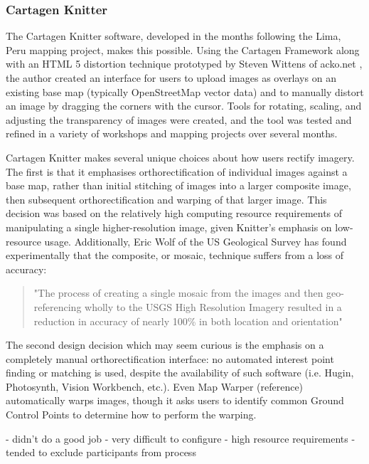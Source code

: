 \documentclass[11pt]{report}
\begin{document}
\subsubsection{Cartagen Knitter}

The Cartagen Knitter software, developed in the months following the Lima, Peru mapping project, makes this possible. Using the Cartagen Framework along with an HTML 5 distortion technique prototyped by Steven Wittens of acko.net \cite{wittens2008projective}, the author created an interface for users to upload images as overlays on an existing base map (typically OpenStreetMap vector data) and to manually distort an image by dragging the corners with the cursor. Tools for rotating, scaling, and adjusting the transparency of images were created, and the tool was tested and refined in a variety of workshops and mapping projects over several months. 

Cartagen Knitter makes several unique choices about how users rectify imagery. The first is that it emphasises orthorectification of individual images against a base map, rather than initial stitching of images into a larger composite image, then subsequent orthorectification and warping of that larger image. This decision was based on the relatively high computing resource requirements of manipulating a single higher-resolution image, given Knitter's emphasis on low-resource usage. Additionally, Eric Wolf of the US Geological Survey has found experimentally that the composite, or mosaic, technique suffers from a loss of accuracy: 

\begin{quote}
"The process of creating a single mosaic from the images and then geo-referencing wholly to the USGS High Resolution Imagery resulted in a reduction in accuracy of nearly 100\% in both location and orientation"
\cite{wolf2006lowcost}
\end{quote}

The second design decision which may seem curious is the emphasis on a completely manual orthorectification interface: no automated interest point finding or matching is used, despite the availability of such software (i.e. Hugin, Photosynth, Vision Workbench, etc.). Even Map Warper (reference) automatically warps images, though it asks users to identify common Ground Control Points to determine how to perform the warping.

- didn't do a good job
- very difficult to configure
- high resource requirements
- tended to exclude participants from process
\end{document}
